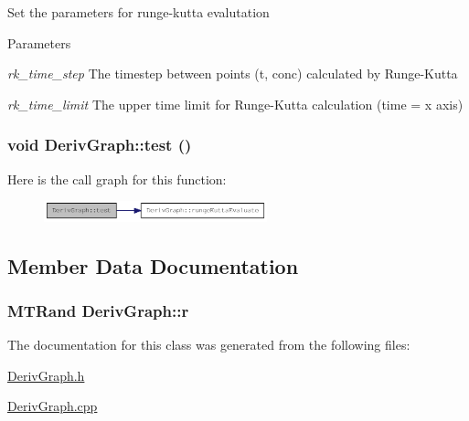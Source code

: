 Set the parameters for runge-\/kutta evalutation


\begin{DoxyParams}{Parameters}
\item[{\em rk\_\-time\_\-step}]The timestep between points (t, conc) calculated by Runge-\/Kutta \item[{\em rk\_\-time\_\-limit}]The upper time limit for Runge-\/Kutta calculation (time = x axis) \end{DoxyParams}
\hypertarget{classDerivGraph_abf589f6aabe2c66bbe6f1aeb68ff4593}{
\subsubsection[{test}]{\setlength{\rightskip}{0pt plus 5cm}void DerivGraph::test ()}}
\label{classDerivGraph_abf589f6aabe2c66bbe6f1aeb68ff4593}


Here is the call graph for this function:\nopagebreak
\begin{figure}[H]
\begin{center}
\leavevmode
\includegraphics[width=183pt]{classDerivGraph_abf589f6aabe2c66bbe6f1aeb68ff4593_cgraph}
\end{center}
\end{figure}


\subsection{Member Data Documentation}
\hypertarget{classDerivGraph_a2d5931b4ca8a9c6e0c013a74a5cfbc7c}{
\subsubsection[{r}]{\setlength{\rightskip}{0pt plus 5cm}MTRand {\bf DerivGraph::r}}}
\label{classDerivGraph_a2d5931b4ca8a9c6e0c013a74a5cfbc7c}


The documentation for this class was generated from the following files:\begin{DoxyCompactItemize}
\item 
\hyperlink{DerivGraph_8h}{DerivGraph.h}\item 
\hyperlink{DerivGraph_8cpp}{DerivGraph.cpp}\end{DoxyCompactItemize}
